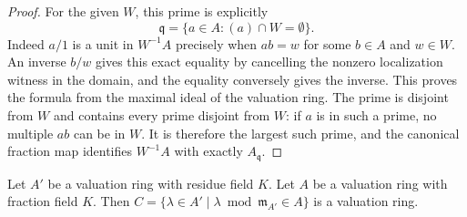 \begin{proof}
For the given $W$, this
prime is explicitly
$$
\mathfrak q=\{a\in A:(a)\cap W=\emptyset\}.
$$
Indeed $a/1$ is a unit
in $W^{-1}A$ precisely when
$ab=w$ for some $b\in A$
and $w\in W$. An inverse
$b/w$ gives this exact
equality by cancelling the
nonzero localization witness
in the domain, and the
equality conversely gives
the inverse. This proves
the formula from the maximal
ideal of the valuation ring.
The prime is disjoint from
$W$ and contains every prime
disjoint from $W$: if
$a$ is in such a prime,
no multiple $ab$ can be
in $W$. It is therefore
the largest such prime,
and the canonical fraction
map identifies $W^{-1}A$
with exactly $A_{\mathfrak q}$.
\end{proof}

\begin{lemma}
\label{editorial-source-lemma-stack-valuation-rings}
Let $A'$ be a valuation ring with residue field $K$.
Let $A$ be a valuation ring with fraction field $K$.
Then
$C = \{\lambda \in A' \mid \lambda \bmod \mathfrak m_{A'} \in A\}$
is a valuation ring.
\end{lemma}

